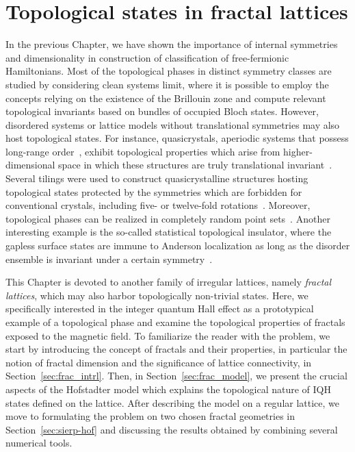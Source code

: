 \chapter{Topological states in fractal lattices}
\label{ch:fractals}

In the previous Chapter, we have shown the importance of internal symmetries and dimensionality in construction of classification of free-fermionic Hamiltonians. Most of the topological phases in distinct symmetry classes are studied by considering clean systems limit, where it is possible to employ the concepts relying on the existence of the Brillouin zone and compute relevant topological invariants based on bundles of occupied Bloch states. However, disordered systems or lattice models without translational symmetries may also host topological states. For instance, quasicrystals, aperiodic systems that possess long-range order~\cite{quasicrystals}, exhibit topological properties which arise from higher-dimensional space in which these structures are truly translational invariant~\cite{PhysRevLett.109.106402}. Several tilings were used to construct quasicrystalline structures hosting topological states protected by the symmetries which are forbidden for conventional crystals, including five- or twelve-fold rotations~\cite{PhysRevLett.124.036803,PhysRevLett.123.196401}. Moreover, topological phases can be realized in completely random point sets~\cite{AmorphTIShenoy2017}. Another interesting example is the so-called statistical topological insulator, where the gapless surface states are immune to Anderson localization as long as the disorder ensemble is invariant under a certain symmetry~\cite{statTI2014}.

This Chapter is devoted to another family of irregular lattices, namely \emph{fractal lattices}, which may also harbor topologically non-trivial states. Here, we specifically interested in the integer quantum Hall effect as a prototypical example of a topological phase and examine the topological properties of fractals exposed to the magnetic field. To familiarize the reader with the problem, we start by introducing the concept of fractals and their properties, in particular the notion of fractal dimension and the significance of lattice connectivity, in Section~\ref{sec:frac_intrl}. Then, in Section~\ref{sec:frac_model}, we present the crucial aspects of the Hofstadter model which explains the topological nature of IQH states defined on the lattice. After describing the model on a regular lattice, we move to formulating the problem on two chosen fractal geometries in Section~\ref{sec:sierp-hof} and discussing the results obtained by combining several numerical tools.
